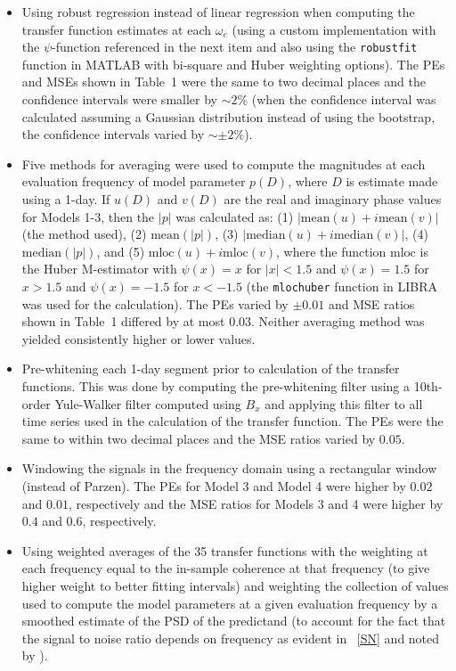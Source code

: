 \documentclass[draft,linenumbers]{agujournal2018}
\begin{document}
\begin{itemize}
\item Using robust regression instead of linear regression when computing the transfer function estimates at each $\omega_e$ (using a custom implementation with the $\psi$-function referenced in the next item and also using the \texttt{robustfit} function in MATLAB with bi-square and Huber weighting options). The PEs and MSEs shown in Table~1 were the same to two decimal places and the confidence intervals were smaller by $\sim 2$\% (when the confidence interval was calculated assuming a Gaussian distribution instead of using the bootstrap, the confidence intervals varied by $\sim\pm 2$\%).

\item Five methods for averaging were used to compute the magnitudes at each evaluation frequency of model parameter $p(D)$, where $D$ is estimate made using a 1-day. If $u(D)$ and $v(D)$ are the real and imaginary phase values for Models 1-3, then the $|p|$ was calculated as: (1) $|\text{mean}(u)+i\text{mean}(v)|$ (the method used), (2) $\text{mean}(|p|)$, (3) $|\text{median}(u)+i\text{median}(v)|$, (4) $\text{median}(|p|)$, and (5) $\text{mloc}(u) + i\text{mloc}(v)$, where the function $\text{mloc}$ is the Huber M-estimator \citep{Huber2011} with $\psi(x)=x$ for $|x|<1.5$ and $\psi(x) = 1.5$ for $x>1.5$ and $\psi(x) = -1.5$ for $x<-1.5$ (the \texttt{mlochuber} function in LIBRA \citep{Verboven2010} was used for the calculation). The PEs varied by $\pm 0.01$ and MSE ratios shown in Table~1 differed by at most $0.03$. Neither averaging method was yielded consistently higher or lower values.

\item Pre-whitening each 1-day segment prior to calculation of the transfer functions. This was done by computing the pre-whitening filter using a 10th-order Yule-Walker filter computed using $B_x$ and applying this filter to all time series used in the calculation of the transfer function. The PEs were the same to within two decimal places and the MSE ratios varied by $0.05$.

\item Windowing the signals in the frequency domain using a rectangular window (instead of Parzen). The PEs for Model 3 and Model 4 were higher by $0.02$ and $0.01$, respectively and the MSE ratios for Models 3 and 4 were higher by $0.4$ and $0.6$, respectively.

\item Using weighted averages of the 35 transfer functions with the weighting at each frequency equal to the in-sample coherence at that frequency (to give higher weight to better fitting intervals) and weighting the collection of values used to compute the model parameters at a given evaluation frequency by a smoothed estimate of the PSD of the predictand (to account for the fact that the signal to noise ratio depends on frequency as evident in ~\ref{SN} and noted by \citep{Egbert1997}).


\end{itemize}
\end{document}
